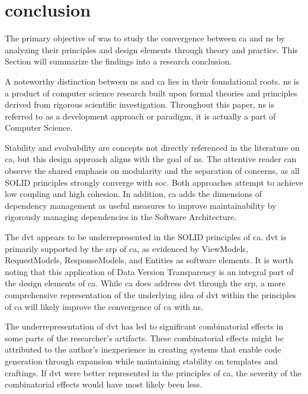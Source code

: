 \section{conclusion}

The primary objective of  was to study the
convergence between \gls{ca} and \gls{ns} by analyzing their principles and design
elements through theory and practice. This Section will summarize the findings into a
research conclusion.

A noteworthy distinction between \gls{ns} and \gls{ca} lies in their foundational roots.
\gls{ns} is a product of computer science research built upon formal theories and
principles derived from rigorous scientific investigation. Throughout this
paper, \gls{ns} is referred to as a development approach or paradigm, it is actually a
part of Computer Science.

Stability and evolvability are concepts not directly referenced in the literature on
\gls{ca}, but this design approach aligns with the goal of \gls{ns}. The attentive reader
can observe the shared emphasis on modularity and the separation of concerns, as all SOLID
principles strongly converge with \gls{soc}. Both approaches attempt to achieve low
coupling and high cohesion. In addition, \gls{ca} adds the dimensions of dependency
management as useful measures to improve maintainability by rigorously managing
dependencies in the Software Architecture.

The \gls{dvt} appears to be underrepresented in the SOLID principles of \gls{ca}.
\gls{dvt} is primarily supported by the \gls{srp} of \gls{ca}, as evidenced by ViewModels,
RequestModels, ResponseModels, and Entities as software elements. It is worth noting that
this application of Data Version Transparency  is an integral part of the design elements
of \gls{ca}. While \gls{ca} does address \gls{dvt} through the \gls{srp}, a more
comprehensive representation of the underlying idea of \gls{dvt} within the principles of
\gls{ca} will likely improve the convergence of \gls{ca} with \gls{ns}.

The underrepresentation of \gls{dvt} has led to significant combinatorial effects in some
parts of the researcher's artifacts. These combinatorial effects might be attributed to the
author's inexperience in creating systems that enable code generation through expansion
while maintaining stability on templates and craftings. If \gls{dvt} were better
represented in the principles of \gls{ca}, the severity of the combinatorial effects would
have most likely been less.

